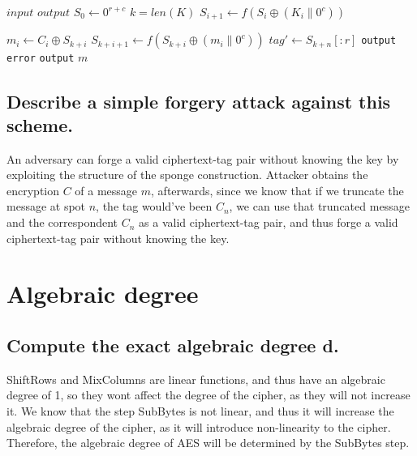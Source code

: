 \documentclass{article}
\begin{document}
\begin{algorithm}
    \algrenewcommand{}
    \algrenewcommand{}
    \caption*{\textbf{Decryption of the Sponge-based Encryption Scheme}}\label{alg:}
    \begin{algorithmic}[1]
        \Require $input$
        \Ensure $output$
        \State $S_0 \gets 0^{r+c}$
        \State $k = len(K)$
         
            \State $S_{i+1} \gets f(S_i \oplus (K_i \| 0^c))$
        \EndFor
        
         
            \State $m_i \gets C_i \oplus S_{k+i}$
            \State $S_{k+i+1} \gets f(S_{k+i} \oplus (m_i\|0^c))$ 
        \EndFor
        \State $tag' \gets S_{k+n}[:r]$ 
            \State \texttt{output} \texttt{error}
        \EndIf
        \State \texttt{output} $m$
    \end{algorithmic}
\end{algorithm}

\subsection{Describe a simple forgery attack against this scheme.}
An adversary can forge a valid ciphertext-tag pair without knowing the key by exploiting the structure of the sponge construction.
Attacker obtains the encryption $C$ of a message $m$, afterwards, since we know that if we truncate the message at spot $n$, the tag would've been $C_{n}$, we can use that truncated message and the correspondent $C_n$ as a valid ciphertext-tag pair, and thus forge a valid ciphertext-tag pair without knowing the key.

\section{Algebraic degree}
\subsection{Compute the exact algebraic degree d.}
ShiftRows and MixColumns are linear functions, and thus have an algebraic degree of 1, so they wont affect the degree of the cipher, as they will not increase it.
We know that the step SubBytes is not linear, and thus it will increase the algebraic degree of the cipher, as it will introduce non-linearity to the cipher. 
Therefore, the algebraic degree of AES will be determined by the SubBytes step.
\end{document}
